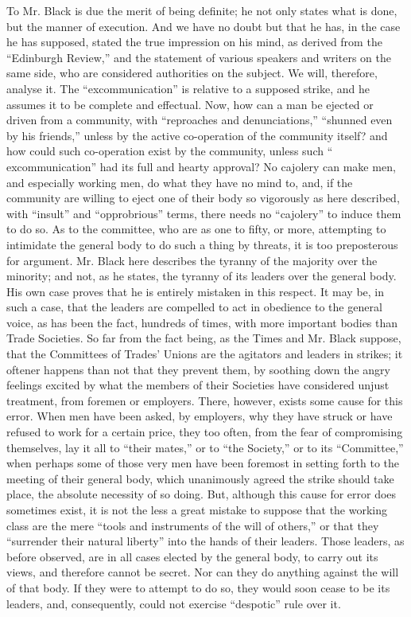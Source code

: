 To Mr. Black is due the merit of being definite; he not only states what
is done, but the manner of execution. And we have no doubt but that he
has, in the case he has supposed, stated the true impression on his
mind, as derived from the ``Edinburgh Review,'' and the statement of
various speakers and writers on the same side, who are considered
authorities on the subject. We will, therefore, analyse it. The
``excommunication'' is relative to a supposed strike, and he assumes it
to be complete and effectual. Now, how can a man be ejected or driven
from a community, with ``reproaches and denunciations,'' ``shunned even
by his friends,'' unless by the active co-operation of the community
itself? and how could such co-operation exist by the community, unless
such `` excommunication'' had its full and hearty approval? No cajolery
can make men, and especially working men, do what they have no mind to,
and, if the community are willing to eject one of their body so
vigorously as here described, with ``insult'' and ``opprobrious'' terms,
there needs no ``cajolery'' to induce them to do so. As to the
committee, who are as one to fifty, or more, attempting to intimidate
the general body to do such a thing by threats, it is too preposterous
for argument. Mr. Black here describes the tyranny of the majority over
the minority; and not, as he states, the tyranny of its leaders over the
general body. His own case proves that he is entirely mistaken in this
respect. It may be, in such a case, that the leaders are compelled to
act in obedience to the general voice, as has been the fact, hundreds of
times, with more important bodies than Trade Societies. So far from the
fact being, as the Times and Mr. Black suppose, that the Committees of
Trades' Unions are the agitators and leaders in strikes; it oftener
happens than not that they prevent them, by soothing down the angry
feelings excited by what the members of their Societies have considered
unjust treatment, from foremen or employers. There, however, exists some
cause for this error. When men have been asked, by employers, why they
have struck or have refused to work for a certain price, they too often,
from the fear of compromising themselves, lay it all to ``their mates,''
or to ``the Society,'' or to its ``Committee,'' when perhaps some of
those very men have been foremost in setting forth to the meeting of
their general body, which unanimously agreed the strike should take
place, the absolute necessity of so doing. But, although this cause for
error does sometimes exist, it is not the less a great mistake to
suppose that the working class are the mere ``tools and instruments of
the will of others,'' or that they ``surrender their natural liberty''
into the hands of their leaders. Those leaders, as before observed, are
in all cases elected by the general body, to carry out its views, and
therefore cannot be secret. Nor can they do anything against the will of
that body. If they were to attempt to do so, they would soon cease to be
its leaders, and, consequently, could not exercise ``despotic'' rule
over it.

